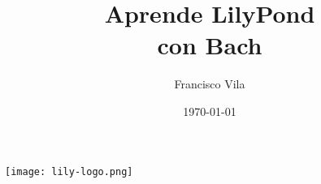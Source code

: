 \documentclass[a4paper,10pt,oneside,headinclude,titlepage]{article} %
\title{Aprende LilyPond\\con Bach}
\author{Francisco Vila}
\date{\today}
\begin{document}
\nonfrenchspacing

\begin{titlepage} %
  \makeatletter
  \begin{center}
    \vfill
    \texttt{[image: lily-logo.png]}\par
    \vfill
    \textbf{\huge\@title}\par
    {\@date}
    \vfill
    \textbf{\large\@author}
    \vfill
  \end{center}
  \makeatother
\end{titlepage}


\begin{singlespace} %
  \tableofcontents
\end{singlespace}
 
 
 
 
 
 
 
 
 
 
 
 
 
 
 
 
 
 
 
 
 
 
 
 
 
 
 
 
 
 
 
 
\end{document}
